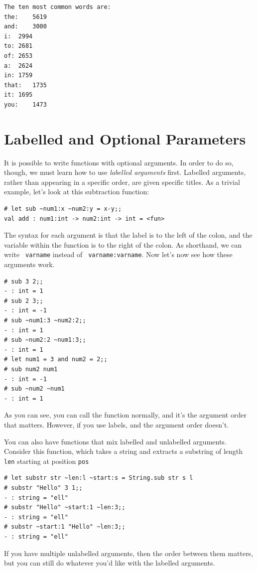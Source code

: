 \documentclass[10pt]{book}
\begin{document}
\beforeverb
\begin{verbatim}
The ten most common words are:
the:	5619
and:	3000
i:	2994
to:	2681
of:	2653
a:	2624
in:	1759
that:	1735
it:	1695
you:	1473
\end{verbatim}
\afterverb

\section{Labelled and Optional Parameters}


It is possible to write functions with optional arguments. In order to do so, though, we must learn how to use {\em labelled arguments} first. Labelled arguments, rather than appearing in a specific order, are given specific titles. As a trivial example, let's look at this subtraction function:

\beforeverb
\begin{verbatim}
# let sub ~num1:x ~num2:y = x-y;;
val add : num1:int -> num2:int -> int = <fun>
\end{verbatim}
\afterverb
The syntax for each argument is that the label is to the left of the colon, and the variable within the function is to the right of the colon. As shorthand, we can write {\tt ~varname} instead of {\tt ~varname:varname}. Now let's now see how these arguments work.
\beforeverb
\begin{verbatim}
# sub 3 2;;
- : int = 1
# sub 2 3;;
- : int = -1
# sub ~num1:3 ~num2:2;;
- : int = 1
# sub ~num2:2 ~num1:3;;
- : int = 1
# let num1 = 3 and num2 = 2;;
# sub num2 num1
- : int = -1
# sub ~num2 ~num1
- : int = 1
\end{verbatim}
\afterverb
As you can see, you can call the function normally, and it's the argument order that matters. However, if you use labels, and the argument order doesn't.

You can also have functions that mix labelled and unlabelled arguments. Consider this function, which takes a string and extracts a substring of length {\tt len} starting at position {\tt pos}
\beforeverb
\begin{verbatim}
# let substr str ~len:l ~start:s = String.sub str s l
# substr "Hello" 3 1;;
- : string = "ell"
# substr "Hello" ~start:1 ~len:3;;
- : string = "ell"
# substr ~start:1 "Hello" ~len:3;;
- : string = "ell"
\end{verbatim}
\afterverb
If you have multiple unlabelled arguments, then the order between them matters, but you can still do whatever you'd like with the labelled arguments.
\end{document}

